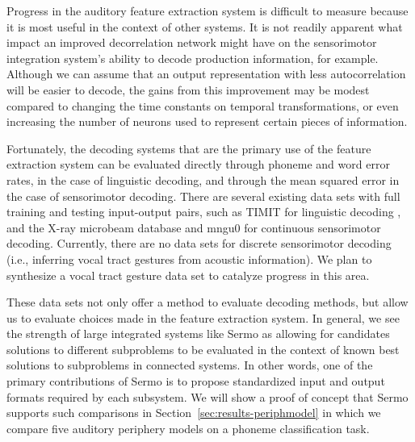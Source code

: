 Progress in the auditory feature extraction system
is difficult to measure
because it is most useful
in the context of other systems.
It is not readily apparent
what impact
an improved decorrelation network
might have on the sensorimotor integration
system's ability to decode production information,
for example.
Although we can assume that
an output representation with
less autocorrelation
will be easier to decode,
the gains from this improvement
may be modest compared to
changing the time constants on temporal transformations,
or even increasing the number of neurons
used to represent certain pieces of information.

Fortunately, the decoding systems
that are the primary use
of the feature extraction system
can be evaluated directly
through phoneme and word error rates,
in the case of linguistic decoding,
and through the mean squared error
in the case of sensorimotor decoding.
There are several existing data sets
with full training and testing
input-output pairs,
such as TIMIT for linguistic decoding
\citep{garofolo1993},
and the X-ray microbeam database \citep{westbury1990}
and mngu0 \citep{steiner2012}
for continuous sensorimotor decoding.
Currently, there are no data sets
for discrete sensorimotor decoding
(i.e., inferring vocal tract gestures
from acoustic information).
We plan to synthesize a
vocal tract gesture
data set to catalyze progress
in this area.

These data sets not only offer a method
to evaluate decoding methods,
but allow us to evaluate choices made
in the feature extraction system.
In general, we see the strength
of large integrated systems like Sermo
as allowing for candidates solutions
to different subproblems
to be evaluated in the context of
known best solutions
to subproblems in connected systems.
In other words,
one of the primary contributions of Sermo
is to propose standardized input and output formats
required by each subsystem.
We will show a proof of concept
that Sermo supports such comparisons
in Section~\ref{sec:results-periphmodel}
in which we compare
five auditory periphery models
on a phoneme classification task.

